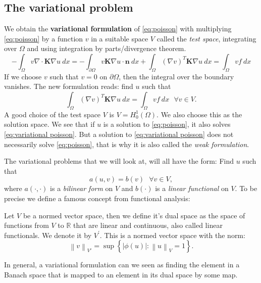 \documentclass[../Main/main.tex]{subfiles}
\begin{document}
	\subsection{The variational problem}

	We obtain the \textbf{variational formulation} of \eqref{eq:poisson} with multiplying \eqref{eq:poisson} by a function $v$ in a suitable space $V$ called the \emph{test space}, integrating over $\Omega$ and using integration by parts/divergence theorem.
	\begin{equation*}
		-\int_{\Omega}v\nabla \cdot\bm{K}\nabla u \ dx = -\int_{\partial \Omega}v \bm{K}\nabla u \cdot \bm{n} \ dx + \int_{\Omega}(\nabla v)^{T}\bm{K} \nabla u \ dx = \int_{\Omega}vf\ dx
	\end{equation*}
	If we choose $v$ such that $v=0$ on $\partial \Omega$, then the integral over the boundary vanishes. The new formulation reads: find $u$ such that 
	\begin{equation}\label{eq:variational poisson}
			 \int_{\Omega}(\nabla v)^T \bm{K} \nabla u \ dx = \int_{\Omega}vf\ dx \ \ \  \forall v \in V.
	\end{equation}
	A good choice of the test space $V$ is $V=H_0^1(\Omega)$. We also choose this as the solution space.
	We see that if $u$ is a solution to \eqref{eq:poisson}, it also solves \eqref{eq:variational poisson}. But a solution to \eqref{eq:variational poisson} does not necessarily solve \eqref{eq:poisson}, that is why it is also called the \emph{weak formulation}.\par
	The variational problems that we will look at, will all have the form: Find $u$ such that
	\begin{equation}\label{eq:variational problem}
			a(u,v) = b(v) \ \ \ \forall v \in V,
	\end{equation}
	where $a(\cdot,\cdot)$ is a \emph{bilinear form} on $V$ and $b(\cdot)$ is a \emph{linear functional} on $V$. To be precise we define a famous concept from functional analysis:
	\begin{definition}
		Let $V$ be a normed vector space, then we define it's dual space as the space of functions from $V$ to $\mathbb{R}$ that are linear and continuous, also called linear functionals. We denote it by $V^{'}$. This is a normed vector space with the norm: \begin{equation*}
\left \| v \right \|_{V'} = \sup \left \{ |\phi(u)|:\left \| u\right \|_V = 1 \right \}. 		\end{equation*}
	\end{definition}
	In general, a variational formulation can we seen as finding the element in a Banach space that is mapped to an element in its dual space by some map.
\end{document}

